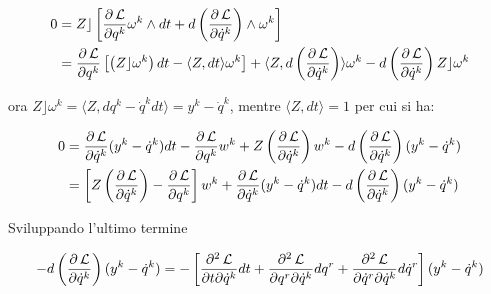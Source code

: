 \begin{equation*}
\begin{split}
0 &= Z \rfloor \left[\frac{\partial \operatorname{\mathcal{L}}}{\partial q^k} \omega^k \wedge dt + d \left( \frac{\partial \operatorname{\mathcal{L}}}{\partial \dot{q}^k} \right) \wedge \omega^k \right]\\
&= \frac{\partial \operatorname{\mathcal{L}}}{\partial q^k} \left[ \left( Z \rfloor \omega^k \right) dt - \langle Z, dt\rangle \omega^k \right] + \langle Z, d \left( \frac{\partial \operatorname{\mathcal{L}}}{\partial \dot{q}^k} \right) \rangle \omega^k -d \left( \frac{\partial \operatorname{\mathcal{L}}}{\partial \dot{q}^k} \right) Z \rfloor \omega^k
\end{split}
\end{equation*}

ora $ Z \rfloor \omega^k = \langle Z, dq^k - \dot{q}^k dt \rangle = y^k - \dot{q}^k $, mentre $ \langle Z, dt \rangle = 1 $ per cui si ha:


\begin{equation*}
\begin{split}
0&=\frac{\partial \operatorname{\mathcal{L}}}{\partial \dot{q}^k}(y^k - \dot{q}^k)dt - \frac{\partial \operatorname{\mathcal{L}}}{\partial q^k}w^k + Z \left(\frac{\partial \operatorname{\mathcal{L}}}{\partial \dot{q}^k}\right) w^k - d\left(\frac{\partial \operatorname{\mathcal{L}}}{\partial \dot{q}^k}\right)(y^k - \dot{q}^k) \\
& =\left[ Z \left( \frac{\partial \operatorname{\mathcal{L}}}{\partial \dot{q}^k}\right) - \frac{\partial \operatorname{\mathcal{L}}}{\partial q^k} \right] w^k + \frac{\partial \operatorname{\mathcal{L}}}{\partial \dot{q}^k}(y^k - \dot{q}^k) dt - d \left( \frac{\partial \operatorname{\mathcal{L}}}{\partial \dot{q}^k}\right) (y^k - \dot{q}^k)
\end{split}
\end{equation*}

Sviluppando l'ultimo termine

\begin{equation*}
- d\left(\frac{\partial \operatorname{\mathcal{L}}}{\partial \dot{q}^k}\right)(y^k- \dot{q}^k) = - \left[\frac{\partial^2 \operatorname{\mathcal{L}}}{\partial t \partial \dot{q}^k}dt + \frac{\partial^2 \operatorname{\mathcal{L}}}{\partial q^r \partial \dot{q}^k}dq^r + \frac{\partial^2 \operatorname{\mathcal{L}}}{\partial \dot{q}^r \partial \dot{q}^k}d\dot{q}^r\right](y^k- \dot{q}^k)
\end{equation*}

